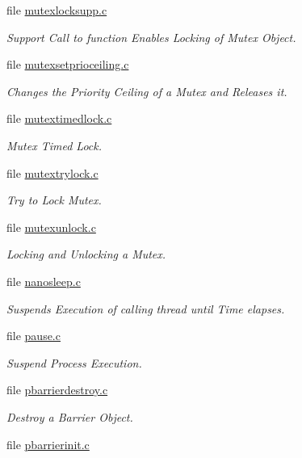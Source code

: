 \begin{DoxyCompactItemize}
file \mbox{\hyperlink{mutexlocksupp_8c}{mutexlocksupp.\+c}}
\begin{DoxyCompactList}\small\item\em Support Call to function Enables Locking of Mutex Object. \end{DoxyCompactList}\item 
file \mbox{\hyperlink{mutexsetprioceiling_8c}{mutexsetprioceiling.\+c}}
\begin{DoxyCompactList}\small\item\em Changes the Priority Ceiling of a Mutex and Releases it. \end{DoxyCompactList}\item 
file \mbox{\hyperlink{mutextimedlock_8c}{mutextimedlock.\+c}}
\begin{DoxyCompactList}\small\item\em Mutex Timed Lock. \end{DoxyCompactList}\item 
file \mbox{\hyperlink{mutextrylock_8c}{mutextrylock.\+c}}
\begin{DoxyCompactList}\small\item\em Try to Lock Mutex. \end{DoxyCompactList}\item 
file \mbox{\hyperlink{mutexunlock_8c}{mutexunlock.\+c}}
\begin{DoxyCompactList}\small\item\em Locking and Unlocking a Mutex. \end{DoxyCompactList}\item 
file \mbox{\hyperlink{nanosleep_8c}{nanosleep.\+c}}
\begin{DoxyCompactList}\small\item\em Suspends Execution of calling thread until Time elapses. \end{DoxyCompactList}\item 
file \mbox{\hyperlink{pause_8c}{pause.\+c}}
\begin{DoxyCompactList}\small\item\em Suspend Process Execution. \end{DoxyCompactList}\item 
file \mbox{\hyperlink{pbarrierdestroy_8c}{pbarrierdestroy.\+c}}
\begin{DoxyCompactList}\small\item\em Destroy a Barrier Object. \end{DoxyCompactList}\item 
file \mbox{\hyperlink{pbarrierinit_8c}{pbarrierinit.\+c}}

\end{DoxyCompactItemize}
